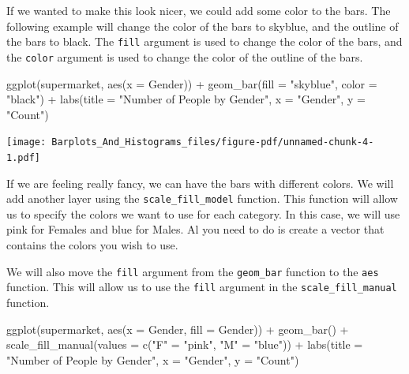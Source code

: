 \documentclass[
  letterpaper,
  DIV=11,
  numbers=noendperiod]{scrreprt}
\newenvironment{Shaded}{\begin{snugshade}}{\end{snugshade}}
\newcommand{\AttributeTok}[1]{\textcolor[rgb]{0.40,0.45,0.13}{#1}}
\newcommand{\FunctionTok}[1]{\textcolor[rgb]{0.28,0.35,0.67}{#1}}
\newcommand{\NormalTok}[1]{\textcolor[rgb]{0.00,0.23,0.31}{#1}}
\newcommand{\OtherTok}[1]{\textcolor[rgb]{0.00,0.23,0.31}{#1}}
\newcommand{\SpecialCharTok}[1]{\textcolor[rgb]{0.37,0.37,0.37}{#1}}
\newcommand{\StringTok}[1]{\textcolor[rgb]{0.13,0.47,0.30}{#1}}
\begin{document}
If we wanted to make this look nicer, we could add some color to the
bars. The following example will change the color of the bars to
skyblue, and the outline of the bars to black. The \texttt{fill}
argument is used to change the color of the bars, and the \texttt{color}
argument is used to change the color of the outline of the bars.

\begin{Shaded}
\begin{Highlighting}[]
\FunctionTok{ggplot}\NormalTok{(supermarket, }\FunctionTok{aes}\NormalTok{(}\AttributeTok{x =}\NormalTok{ Gender)) }\SpecialCharTok{+}
  \FunctionTok{geom\_bar}\NormalTok{(}\AttributeTok{fill =} \StringTok{"skyblue"}\NormalTok{, }\AttributeTok{color =} \StringTok{"black"}\NormalTok{) }\SpecialCharTok{+}
  \FunctionTok{labs}\NormalTok{(}\AttributeTok{title =} \StringTok{"Number of People by Gender"}\NormalTok{,}
       \AttributeTok{x =} \StringTok{"Gender"}\NormalTok{,}
       \AttributeTok{y =} \StringTok{"Count"}\NormalTok{)}
\end{Highlighting}
\end{Shaded}

\texttt{[image: Barplots\_And\_Histograms\_files/figure-pdf/unnamed-chunk-4-1.pdf]}

If we are feeling really fancy, we can have the bars with different
colors. We will add another layer using the \texttt{scale\_fill\_model}
function. This function will allow us to specify the colors we want to
use for each category. In this case, we will use pink for Females and
blue for Males. Al you need to do is create a vector that contains the
colors you wish to use.

We will also move the \texttt{fill} argument from the \texttt{geom\_bar}
function to the \texttt{aes} function. This will allow us to use the
\texttt{fill} argument in the \texttt{scale\_fill\_manual} function.

\begin{Shaded}
\begin{Highlighting}[]
\FunctionTok{ggplot}\NormalTok{(supermarket, }\FunctionTok{aes}\NormalTok{(}\AttributeTok{x =}\NormalTok{ Gender, }\AttributeTok{fill =}\NormalTok{ Gender)) }\SpecialCharTok{+}
  \FunctionTok{geom\_bar}\NormalTok{() }\SpecialCharTok{+}
  \FunctionTok{scale\_fill\_manual}\NormalTok{(}\AttributeTok{values =} \FunctionTok{c}\NormalTok{(}\StringTok{"F"} \OtherTok{=} \StringTok{"pink"}\NormalTok{, }\StringTok{"M"} \OtherTok{=} \StringTok{"blue"}\NormalTok{)) }\SpecialCharTok{+}
  \FunctionTok{labs}\NormalTok{(}\AttributeTok{title =} \StringTok{"Number of People by Gender"}\NormalTok{,}
       \AttributeTok{x =} \StringTok{"Gender"}\NormalTok{,}
       \AttributeTok{y =} \StringTok{"Count"}\NormalTok{)}
\end{Highlighting}
\end{Shaded}
\end{document}
